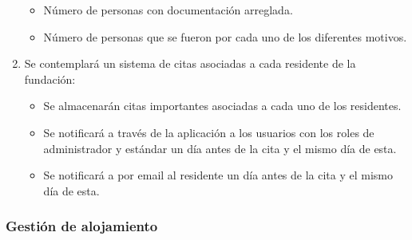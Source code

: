 \begin{enumerate}[start=9,label={RF-\arabic*.}]
\begin{itemize}
            \item Número de personas con documentación arreglada.
            \item Número de personas que se fueron por cada uno de los diferentes motivos.
        \end{itemize}
    \item Se contemplará un sistema de citas asociadas a cada residente de la fundación:
        \begin{itemize}
            \item Se almacenarán citas importantes asociadas a cada uno de los residentes.
            \item Se notificará a través de la aplicación a los usuarios con los roles de administrador y estándar un día antes de la cita y el mismo día de esta.
            \item Se notificará a por email al residente un día antes de la cita y el mismo día de esta.
        \end{itemize}

\end{enumerate}

\subsubsection{Gestión de alojamiento}

